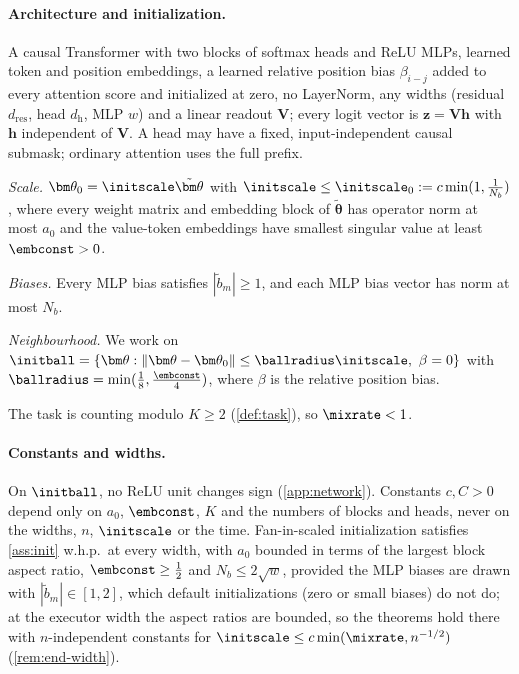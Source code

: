 \paragraph{Architecture and initialization.}

\begin{assumption}[Architecture]
\label{ass:arch}
A causal Transformer with two blocks of softmax heads and ReLU MLPs, learned token and position
embeddings, a learned relative position bias $\beta_{i-j}$ added to every attention score and initialized at zero, no
LayerNorm, any widths (residual $d_{\mathrm{res}}$, head $d_{\mathrm h}$, MLP $w$) and a linear readout $\mathbf V$;
every logit vector is $\bm z=\mathbf V\bm h$ with $\bm h$ independent of $\mathbf V$. A head may have a fixed, input-independent causal submask;
ordinary attention uses the full prefix.
\end{assumption}

\begin{assumption}[Initialization]
\label{ass:init}
\emph{Scale.} $\bm\theta_0=\initscale\tilde{\bm\theta}$ with $\initscale\le\initscale_0:=c\min(1,\frac{1}{N_b})$, where every weight matrix and embedding block of $\tilde{\bm\theta}$ has operator norm
at most $a_0$ and the value-token embeddings have smallest singular value at least $\embconst>0$.

\emph{Biases.} Every MLP bias satisfies $|\tilde b_m|\ge1$, and each MLP bias vector has norm at most $N_b$.

\emph{Neighbourhood.} We work on
$\initball=\{\bm\theta:\|\bm\theta-\bm\theta_0\|\le\ballradius\initscale,\ \beta=0\}$ with $\ballradius=\min(\frac{1}{8},\frac{\embconst}{4})$, where $\beta$ is the
relative position bias.
\end{assumption}

\begin{assumption}[Task]
\label{ass:task}
The task is counting modulo $K\ge2$ (\cref{def:task}), so $\mixrate<1$.
\end{assumption}

\paragraph{Constants and widths.} On $\initball$, no ReLU unit changes sign (\cref{app:network}). Constants $c,C>0$ depend only on $a_0$, $\embconst$, $K$
and the numbers of blocks and heads, never on the widths, $n$, $\initscale$ or the time. Fan-in-scaled initialization
satisfies \cref{ass:init} w.h.p.\ at every width, with $a_0$ bounded in terms of the largest block aspect ratio,
$\embconst\ge\tfrac{1}{2}$ and $N_b\le2\sqrt w$, provided the MLP biases are drawn with $|\tilde b_m|\in[1,2]$, which default
initializations (zero or small biases) do not do; at the executor width the aspect ratios are bounded, so the theorems
hold there with $n$-independent constants for $\initscale\le c\min(\mixrate,n^{-1/2})$ (\cref{rem:end-width}).

